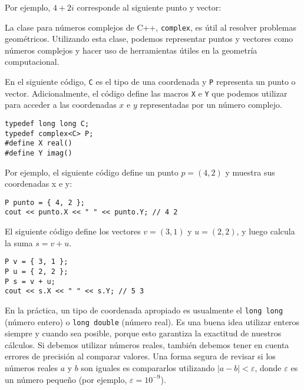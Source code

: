 Por ejemplo, $4+2i$ corresponde al siguiente punto y vector:

\begin{center}
\end{center}


La clase para números complejos de C++, \texttt{complex}, es útil al resolver
problemas geométricos. Utilizando esta clase, podemos representar puntos y
vectores como números complejos y hacer uso de herramientas útiles en
la geometría computacional.

En el siguiente código, \texttt{C} es el tipo de una coordenada y \texttt{P}
representa un punto o vector. Adicionalmente, el código define las macros
\texttt{X} e \texttt{Y} que podemos utilizar para acceder a las coordenadas
$x$ e $y$ representadas por un número complejo.

\begin{lstlisting}
typedef long long C;
typedef complex<C> P;
#define X real()
#define Y imag()
\end{lstlisting}

Por ejemplo, el siguiente código define un punto $p=(4,2)$ y muestra sus
coordenadas x e y:

\begin{lstlisting}
P punto = { 4, 2 };
cout << punto.X << " " << punto.Y; // 4 2
\end{lstlisting}

El siguiente código define los vectores $v=(3,1)$ y $u=(2,2)$, y luego calcula
la suma $s=v+u$.

\begin{lstlisting}
P v = { 3, 1 };
P u = { 2, 2 };
P s = v + u;
cout << s.X << " " << s.Y; // 5 3
\end{lstlisting}

En la práctica, un tipo de coordenada apropiado es usualmente el
\texttt{long long} (número entero) o \texttt{long double} (número real).
Es una buena idea utilizar enteros siempre y cuando sea posible, porque
esto garantiza la exactitud de nuestros cálculos. Si debemos utilizar números
reales, también debemos tener en cuenta errores de precisión al comparar
valores. Una forma segura de revisar si los números reales $a$ y $b$ son
iguales es compararlos utilizando $|a-b|<\varepsilon$, donde $\varepsilon$
es un número pequeño (por ejemplo, $\varepsilon=10^{-9}$).

